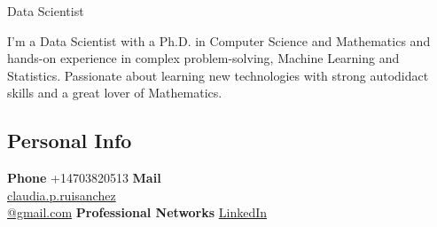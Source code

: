 \documentclass[]{friggeri-cv}
\begin{document}
      {Data Scientist}
      
I'm a Data Scientist  with  a Ph.D. in Computer Science and Mathematics and  hands-on experience in complex problem-solving, Machine Learning and Statistics. Passionate about learning new technologies with strong autodidact skills  and a great lover of Mathematics. 


\begin{aside}
  \section{Personal Info}
  \textbf{Phone} +14703820513
  \textbf{Mail} \\\href{mailto:claudia.p.ruisanchez@gmail.com}{claudia.p.ruisanchez\\@gmail.com}
   \textbf{Professional Networks}
    \href{https://www.linkedin.com/in/claudiaperezruisanchez/}{LinkedIn}

\end{aside}
\end{document}
